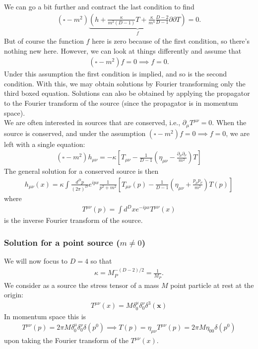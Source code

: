 \documentclass{book}
\theoremstyle{definition}
\newcommand{\p}{\partial}
\newcommand{\f}[2]{\frac{#1}{#2}}
\newcommand{\lp}{\left(}
\newcommand{\rp}{\right)}
\newcommand{\lb}{\left[}
\newcommand{\rb}{\right]}
\begin{document}
We can go a bit further and contract the last condition to find
\begin{align}
(\square - m^2)\underbrace{\lp h + \f{\kappa}{m^2(D-1)}T + \f{\kappa}{m^4}\f{D-2}{D-1}\p \p T \rp}_{f} = 0.
\end{align}
But of course the function $f$ here is zero because of the first condition, so there's nothing new here. However, we can look at things differently and assume that
\begin{align}
(\square - m^2)f =0\implies f =0.
\end{align}
Under this assumption the first condition is implied, and so is the second condition. With this, we may obtain solutions by Fourier transforming only the third boxed equation. Solutions can also be obtained by applying the propagator to the Fourier transform of the source (since the propagator is in momentum space).\\

We are often interested in sources that are conserved, i.e., $\p_\mu T^{\mu\nu} =0$. When the source is conserved, and under the assumption $(\square - m^2)f = 0\implies f=0$, we are left with a single equation:
\begin{align}
\boxed{(\square - m^2)h_{\mu\nu} = -\kappa \lb T_{\mu\nu} - \f{1}{D-1}\lp \eta_{\mu\nu} - \f{\p_\mu \p_\nu}{m^2} \rp T  \rb}
\end{align}
The general solution for a conserved source is then
\begin{align}\label{soln}
\boxed{h_{\mu\nu}(x) = \kappa\int \f{d^D p}{(2\pi)^D}e^{ipx}\f{1}{p^2 + m^2} \lb T_{\mu\nu}(p) - \f{1}{D-1}\lp \eta_{\mu\nu} + \f{p_\mu p_\nu}{m^2} \rp T(p) \rb}
\end{align}
where
\begin{align}
T^{\mu\nu}(p) = \int d^D x e^{-ipx}T^{\mu\nu}(x)
\end{align}
is the inverse Fourier transform of the source. 








\subsubsection{Solution for a point source ($m\neq 0$)}

We will now focus to $D=4$ so that 
\begin{align}
\kappa = M_P^{-(D-2)/2} = \f{1}{M_P}.
\end{align}
We consider as a source the stress tensor of a mass $M$ point particle at rest at the origin:
\begin{align}
\boxed{T^{\mu\nu}(x) = M \delta^\mu_0 \delta^\nu_0 \delta^3(\mathbf{x})}
\end{align} 
In momentum space this is 
\begin{align}
\boxed{T^{\mu\nu}(p) = 2\pi M \delta^\mu_0 \delta^\nu_0 \delta(p^0) \implies T(p) = \eta_{\mu\nu}T^{\mu\nu}(p) = 2\pi M \eta_{00}\delta(p^0)}
\end{align}
upon taking the Fourier transform of the $T^{\mu\nu}(x)$.\\
\end{document}
